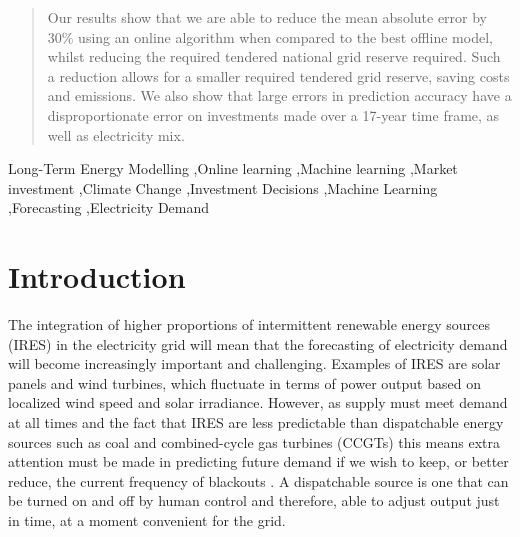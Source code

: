 \documentclass[final,3p,times,twocolumn,numbers]{elsarticle}
\begin{document}
\begin{frontmatter}
\begin{abstract}

Our results show that we are able to reduce the mean absolute error by 30\% using an online algorithm when compared to the best offline model, whilst reducing the required tendered national grid reserve required. Such a reduction allows for a smaller required tendered grid reserve, saving costs and emissions. We also show that large errors in prediction accuracy have a disproportionate error on investments made over a 17-year time frame, as well as electricity mix.


\end{abstract}



%
%

\begin{keyword}
Long-Term Energy Modelling \sep Online learning \sep Machine learning \sep Market investment \sep Climate Change \sep Investment Decisions \sep Machine Learning \sep Forecasting \sep  Electricity Demand


\end{keyword}

\end{frontmatter}


\section{Introduction}
\label{sec:intro}

The integration of higher proportions of intermittent renewable energy sources (IRES) in the electricity grid will mean that the forecasting of electricity demand will become increasingly important and challenging. Examples of IRES are solar panels and wind turbines, which fluctuate in terms of power output based on localized wind speed and solar irradiance. However, as supply must meet demand at all times and the fact that IRES are less predictable than dispatchable energy sources such as coal and combined-cycle gas turbines (CCGTs) this means extra attention must be made in predicting future demand if we wish to keep, or better reduce, the current frequency of blackouts \cite{Lu1993}. A dispatchable source is one that can be turned on and off by human control and therefore, able to adjust output just in time, at a moment convenient for the grid.
\end{document}
